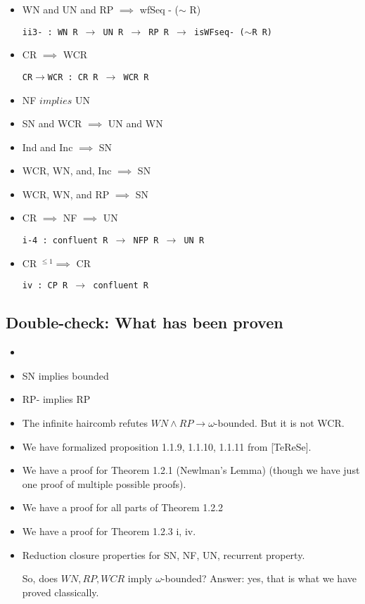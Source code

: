 \documentclass{scrartcl}
\begin{document}
{\begin{itemize}
\texttt{i+ : WN R $\to$ UN$\to$ R $\to$ bounded R}

\item{WN and UN and RP $\implies$ wfSeq - ($\sim$ R)}

\texttt{ii3- :  WN R $\to$ UN R $\to$ RP R $\to$ isWFseq- ($\sim$R R)}

\item {CR $\implies$ WCR}

\texttt{CR$\to$WCR : CR R $\to$ WCR R }

\item {NF $implies$ UN}

\item {SN and WCR $\implies$ UN and WN}
\texttt{}

\item {Ind and Inc $\implies$ SN} 


\item {WCR, WN, and, Inc $\implies$ SN}


\item {WCR, WN, and RP $\implies$ SN}


\item {CR $\implies$ NF $\implies$ UN}

\texttt{i-4 : confluent R $\to$ NFP R $\to$ UN R}

\item {CR $^{\leq1} \implies$ CR}

\texttt{iv : CP R $\to$ confluent R}

\end{itemize}
}

\subsection{Double-check: What has been proven}
\begin{itemize}
  \item {}
  \item SN implies bounded
  \item RP- implies RP
  \item The infinite haircomb refutes $WN \land RP \to \omega$-bounded.  But it is not WCR.
  \item We have formalized proposition 1.1.9, 1.1.10, 1.1.11 from [TeReSe].
  \item We have a proof for Theorem 1.2.1 (Newlman's Lemma) (though we have just one proof of multiple possible proofs).
  \item We have a proof for all parts of Theorem 1.2.2
  \item We have a proof for Theorem 1.2.3 i, iv.
  \item Reduction closure properties for SN, NF, UN, recurrent property.

  So, does $WN, RP, WCR$ imply $\omega$-bounded?
  Answer: yes, that is what we have proved classically.
\end{itemize}
\end{document}
